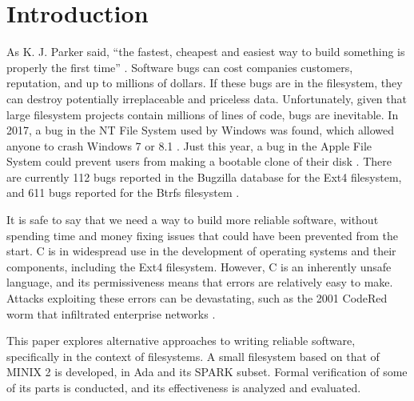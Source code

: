 \section{Introduction}
As K. J. Parker said, ``the fastest, cheapest and easiest way to build something is properly the first time'' \cite{parker2007}.
Software bugs can cost companies customers, reputation, and up to millions of dollars.
If these bugs are in the filesystem, they can destroy potentially irreplaceable and priceless data.
Unfortunately, given that large filesystem projects contain millions of lines of code, bugs are inevitable.
In 2017, a bug in the NT File System used by Windows was found, which allowed anyone to crash Windows 7 or 8.1 \cite{bright2017}.
Just this year, a bug in the Apple File System could prevent users from making a bootable clone of their disk \cite{bombich2020}.
There are currently 112 bugs reported in the Bugzilla database for the Ext4 filesystem, and 611 bugs reported for the Btrfs filesystem \cite{bugzilla2020}.

It is safe to say that we need a way to build more reliable software, without spending time and money fixing issues that could have been prevented from the start.
C is in widespread use in the development of operating systems and their components, including the Ext4 filesystem.
However, C is an inherently unsafe language, and its permissiveness means that errors are relatively easy to make.
Attacks exploiting these errors can be devastating, such as the 2001 CodeRed worm that infiltrated enterprise networks \cite{trendmicro2002}.

This paper explores alternative approaches to writing reliable software, specifically in the context of filesystems.
A small filesystem based on that of MINIX 2 is developed, in Ada and its SPARK subset.
Formal verification of some of its parts is conducted, and its effectiveness is analyzed and evaluated.
